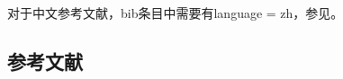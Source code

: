 对于中文参考文献，bib条目中需要有language = {zh}，参见\cite{test2}。

\begin{REF}
\subsection*{参考文献}
\vspace{-50pt}

\end{REF}

